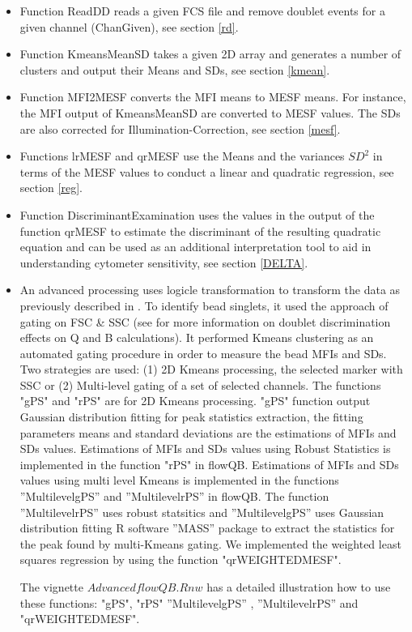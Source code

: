 \documentclass{article}
\begin{document}
\begin{itemize}
\item Function ReadDD reads a given FCS file and remove doublet events for a given channel (ChanGiven), see section \ref{rd}. 
\item Function KmeansMeanSD takes a given 2D array and generates a number of clusters and output their Means and SDs, see section \ref{kmean}. 
\item Function MFI2MESF converts the MFI means to MESF means. For instance, the MFI output of KmeansMeanSD are converted to MESF values. The SDs are also corrected for Illumination-Correction, see section \ref{mesf}.
\item Functions lrMESF and qrMESF use the Means and the variances $SD^{2}$ in terms of the MESF values to conduct a linear and quadratic regression, see section \ref{reg}. 

\item Function DiscriminantExamination uses the values in the output of the function qrMESF to estimate the discriminant of the resulting quadratic equation and can be used as an additional interpretation tool to aid in understanding cytometer sensitivity, see section \ref{DELTA}. 

\item An advanced processing uses logicle transformation to transform the data as previously described in \cite{lt}. To identify bead singlets, it used the approach of gating on FSC \& SSC (see \cite{CH,HW} for more information on doublet discrimination effects on Q and B calculations). It performed Kmeans
 clustering as an automated gating procedure in order to measure the bead MFIs and SDs. Two strategies are used: (1) 2D Kmeans processing, the selected marker with SSC or  (2) Multi-level gating of a set of selected channels. The functions "gPS" and "rPS" are for 2D Kmeans processing. "gPS" function output Gaussian distribution fitting for peak statistics extraction, the fitting parameters means and standard deviations are the estimations of MFIs and SDs values. Estimations of MFIs and SDs values using Robust Statistics \cite{rs} is implemented in the function "rPS" in flowQB. Estimations of MFIs and SDs values using multi level Kmeans is implemented in the functions ”MultilevelgPS” and ”MultilevelrPS” in flowQB. The function ”MultilevelrPS” uses robust statsitics and ”MultilevelgPS” uses Gaussian distribution fitting R software ”MASS” package to extract the statistics for the peak found by multi-Kmeans gating. We implemented the weighted least squares regression by using the function "qrWEIGHTEDMESF".

The vignette $AdvancedflowQB.Rnw$ has a detailed illustration how to use these functions:  "gPS", "rPS" ”MultilevelgPS” , ”MultilevelrPS” and "qrWEIGHTEDMESF".

\end{itemize}
\end{document}
